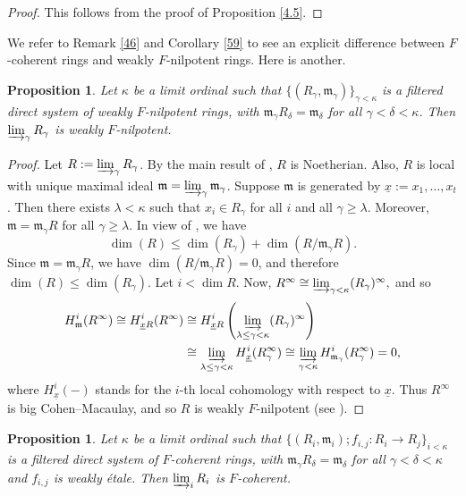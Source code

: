\documentclass[11pt,a4paper]{amsart}
\numberwithin{equation}{section}
\newtheorem{proposition}[theorem]{Proposition}
\theoremstyle{definition}
\theoremstyle{remark}
\begin{document}
\begin{proof}
	This follows from the proof of Proposition \ref{4.5}.
\end{proof}

We refer to Remark \ref{46} and Corollary \ref{59} to see an explicit difference between \(F\)-coherent rings and weakly \(F\)-nilpotent rings.
Here is another.

\begin{proposition}\label{obs:limits}
	Let \(\kappa\) be a limit ordinal such that \(\{(R_\gamma, \mathfrak m_\gamma)\}_{\gamma < \kappa}\) is a filtered direct system of weakly \(F\)-nilpotent rings, with \(\mathfrak m_\gamma R_\delta = \mathfrak m_\delta\) for all \(\gamma < \delta < \kappa\). Then \(\varinjlim_{\gamma} R_\gamma\) is weakly \(F\)-nilpotent.
\end{proposition}

\begin{proof}
	Let \(R := \varinjlim_{\gamma} R_\gamma\). By the main result of \cite{O}, \(R\) is Noetherian. Also, \(R\) is local with unique maximal ideal \(\mathfrak m = \varinjlim_{\gamma} \mathfrak m_\gamma\). Suppose \(\mathfrak m\) is generated by \(\underline{x} := x_1, \ldots, x_t\). Then there exists \(\lambda < \kappa\) such that \(x_i \in R_\gamma\) for all \(i\) and all \(\gamma \ge \lambda\). Moreover, \(\mathfrak m = \mathfrak m_\gamma R\) for all \(\gamma \ge \lambda\).
	In view of \cite[Theorem 15.1]{Mat}, we have
	\[
	\dim (R )\le \dim (R_\gamma) + \dim (R / \mathfrak m_\gamma R).
	\]
	Since \(\mathfrak m = \mathfrak m_\gamma R\), we have \(\dim (R / \mathfrak m_\gamma R) = 0\), and therefore \(\dim (R) \le \dim (R_\gamma)\).
	Let \(i < \dim R\). Now,
	\(
	R^\infty \cong \varinjlim_{\gamma < \kappa} (R_\gamma)^\infty,
	\)
	and so
	\[
	\begin{aligned}
	H_{\mathfrak m}^{i}(R^\infty)
	 \cong H_{\underline{x}R}^{i}(R^\infty) 
	&\cong H_{\underline{x}R}^{i}\left(\varinjlim_{\lambda \le \gamma < \kappa} (R_\gamma)^\infty\right) \\
	&\cong \varinjlim_{\lambda \le \gamma < \kappa} H_{\underline{x}}^{i}(R_\gamma^\infty)\cong \varinjlim_{\gamma < \kappa} H_{\mathfrak m_\gamma}^{i}(R_\gamma^\infty) = 0,
	\end{aligned}
	\]where $H_{\underline{x}}^{i}(-)$ stands for the $i$-th local cohomology with respect to $\underline{x}$.
	Thus \(R^\infty\) is big Cohen--Macaulay, and so \(R\) is weakly \(F\)-nilpotent (see \cite[Proposition 12.22]{MP}).
\end{proof}\begin{proposition}\label{obs:limits}
Let \(\kappa\) be a limit ordinal such that \(\{(R_i, \mathfrak m_i);f_{i,j}:R_i\to R_j\}_{i < \kappa}\) is a filtered direct system of  \(F\)-coherent rings, with \(\mathfrak m_\gamma R_\delta = \mathfrak m_\delta\) for all \(\gamma < \delta < \kappa\) and $f_{i,j}$ is  weakly \'etale. Then \(\varinjlim_{i} R_i\) is \(F\)-coherent.
\end{proposition}
\end{document}
